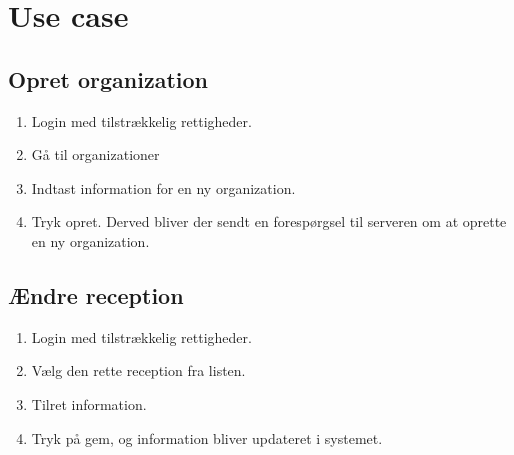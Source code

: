 \section{Use case}

\subsection{Opret organization}
\begin{enumerate}
  \item Login med tilstrækkelig rettigheder.
  \item Gå til organizationer
  \item Indtast information for en ny organization.
  \item Tryk opret. Derved bliver der sendt en forespørgsel til serveren om at oprette en ny organization.
\end{enumerate}

\subsection{Ændre reception}
\begin{enumerate}
  \item Login med tilstrækkelig rettigheder.
  \item Vælg den rette reception fra listen.
  \item Tilret information.
  \item Tryk på gem, og information bliver updateret i systemet.
\end{enumerate}
